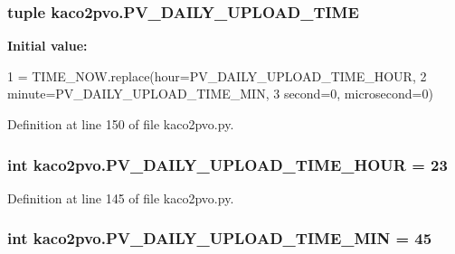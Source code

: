 \subsubsection[{P\+V\+\_\+\+D\+A\+I\+L\+Y\+\_\+\+U\+P\+L\+O\+A\+D\+\_\+\+T\+I\+M\+E}]{\setlength{\rightskip}{0pt plus 5cm}tuple kaco2pvo.\+P\+V\+\_\+\+D\+A\+I\+L\+Y\+\_\+\+U\+P\+L\+O\+A\+D\+\_\+\+T\+I\+M\+E}\label{namespacekaco2pvo_acdd697a7c8e4d2d9d64dc216df3eca02}
{\bfseries Initial value\+:}
\begin{DoxyCode}
1 = TIME\_NOW.replace(hour=PV\_DAILY\_UPLOAD\_TIME\_HOUR,
2                                         minute=PV\_DAILY\_UPLOAD\_TIME\_MIN,
3                                         second=0, microsecond=0)
\end{DoxyCode}


Definition at line 150 of file kaco2pvo.\+py.

\hypertarget{namespacekaco2pvo_a8ee8c3a356a6e5070403190c5a5c111c}{}
\subsubsection[{P\+V\+\_\+\+D\+A\+I\+L\+Y\+\_\+\+U\+P\+L\+O\+A\+D\+\_\+\+T\+I\+M\+E\+\_\+\+H\+O\+U\+R}]{\setlength{\rightskip}{0pt plus 5cm}int kaco2pvo.\+P\+V\+\_\+\+D\+A\+I\+L\+Y\+\_\+\+U\+P\+L\+O\+A\+D\+\_\+\+T\+I\+M\+E\+\_\+\+H\+O\+U\+R = 23}\label{namespacekaco2pvo_a8ee8c3a356a6e5070403190c5a5c111c}


Definition at line 145 of file kaco2pvo.\+py.

\hypertarget{namespacekaco2pvo_adfa392fe355836276e546d4d6d4eca52}{}
\subsubsection[{P\+V\+\_\+\+D\+A\+I\+L\+Y\+\_\+\+U\+P\+L\+O\+A\+D\+\_\+\+T\+I\+M\+E\+\_\+\+M\+I\+N}]{\setlength{\rightskip}{0pt plus 5cm}int kaco2pvo.\+P\+V\+\_\+\+D\+A\+I\+L\+Y\+\_\+\+U\+P\+L\+O\+A\+D\+\_\+\+T\+I\+M\+E\+\_\+\+M\+I\+N = 45}\label{namespacekaco2pvo_adfa392fe355836276e546d4d6d4eca52}


